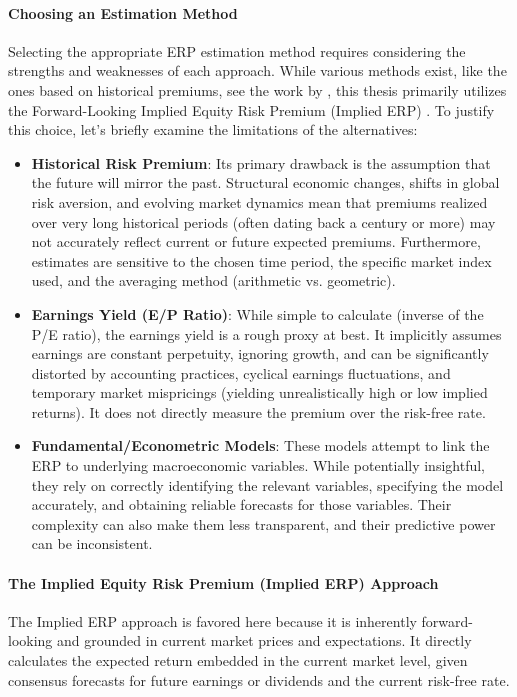 \paragraph{Choosing an Estimation Method}
Selecting the appropriate ERP estimation method requires considering the strengths and weaknesses of each approach. While various methods exist, like the ones based on historical premiums, see the work by \textcite{fama_french_2002}, this thesis primarily utilizes the Forward-Looking Implied Equity Risk Premium (Implied ERP) \parencite{damodaran2008erp}. To justify this choice, let's briefly examine the limitations of the alternatives:
\begin{itemize}
    \item \textbf{Historical Risk Premium}: Its primary drawback is the assumption that the future will mirror the past. Structural economic changes, shifts in global risk aversion, and evolving market dynamics mean that premiums realized over very long historical periods (often dating back a century or more) may not accurately reflect current or future expected premiums. Furthermore, estimates are sensitive to the chosen time period, the specific market index used, and the averaging method (arithmetic vs. geometric).
    \item \textbf{Earnings Yield (E/P Ratio)}: While simple to calculate (inverse of the P/E ratio), the earnings yield is a rough proxy at best. It implicitly assumes earnings are constant perpetuity, ignoring growth, and can be significantly distorted by accounting practices, cyclical earnings fluctuations, and temporary market mispricings (yielding unrealistically high or low implied returns). It does not directly measure the premium over the risk-free rate.
    \item \textbf{Fundamental/Econometric Models}: These models attempt to link the ERP to underlying macroeconomic variables. While potentially insightful, they rely on correctly identifying the relevant variables, specifying the model accurately, and obtaining reliable forecasts for those variables. Their complexity can also make them less transparent, and their predictive power can be inconsistent.
\end{itemize}

\paragraph{The Implied Equity Risk Premium (Implied ERP) Approach}
The Implied ERP approach is favored here because it is inherently forward-looking and grounded in current market prices and expectations. It directly calculates the expected return embedded in the current market level, given consensus forecasts for future earnings or dividends and the current risk-free rate.

